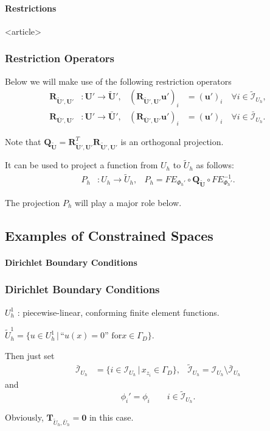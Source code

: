 \paragraph{Restrictions} 

\begin{frame}<article>
\frametitle<presentation>{Restriction Operators}
Below we will make use of the following restriction operators
\begin{align*}
\mathbf{R}_{\tilde{\mathbf{U}}',\mathbf{U}'} &: \mathbf{U}' \to \tilde{\mathbf{U}}', & 
(\mathbf{R}_{\tilde{\mathbf{U}}',\mathbf{U}'}\mathbf{u}')_i &= 
(\mathbf{u}')_i \quad \forall i\in \tilde{\mathcal{I}}_{U_h},\\
\mathbf{R}_{\bar{\mathbf{U}}',\mathbf{U}'} &: \mathbf{U}' \to \bar{\mathbf{U}}', & 
(\mathbf{R}_{\bar{\mathbf{U}}',\mathbf{U}'}\mathbf{u}')_i &= 
(\mathbf{u}')_i \quad \forall i\in \bar{\mathcal{I}}_{U_h}.
\end{align*}

Note that $\mathbf{Q}_{\tilde{\mathbf{U}}}
= \mathbf{R}_{\tilde{\mathbf{U}}',\mathbf{U}'}^T \mathbf{R}_{\tilde{\mathbf{U}}',\mathbf{U}'}$
is an orthogonal projection.

It can be used to project a function from $U_h$ to $\tilde{U}_h$ as
follows:
\begin{align*}
P_h &: U_h \to \tilde{U}_h, & P_h  =
FE_{\Phi_h'} \circ \mathbf{Q}_{\tilde{\mathbf{U}}} \circ
FE_{\Phi_h'}^{-1} .
\end{align*}

The projection $P_h$ will play a major role below.
\end{frame}

\subsection{Examples of Constrained Spaces}

\paragraph{Dirichlet Boundary Conditions}

\begin{frame}
\frametitle<presentation>{Dirichlet Boundary Conditions}
$U_h^1$ :  piecewise-linear, conforming finite
element functions.

$\tilde{U}_h^1 = \{u\in U_h^1 \,|\, \text{``$u(x)=0$'' for
$x\in \Gamma_D$}\}$.

Then just set 
\begin{align*}
\bar{\mathcal{I}}_{U_h} &= \{i\in \mathcal{I}_{U_h} \,|\,
x_{z_i}\in\Gamma_D\}, &
\tilde{\mathcal{I}}_{U_h} =  \mathcal{I}_{U_h}\setminus\bar{\mathcal{I}}_{U_h}
\end{align*}
and
\begin{equation*}
\phi_i' = \phi_i \qquad i\in \tilde{\mathcal{I}}_{U_h}.
\end{equation*}

Obviously, $\mathbf{T}_{\tilde{U}_h,\bar{U}_h}=\mathbf{0}$ in this case.
\end{frame}

